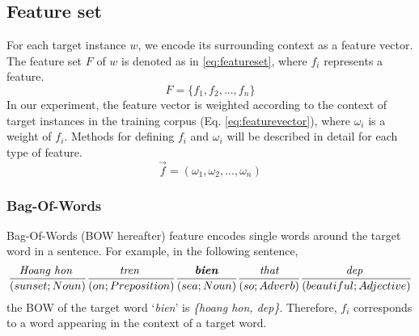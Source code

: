 \documentclass[english]{jnlp_1.4}
\begin{document}
\subsection{Feature set}
\label{featureset}
For each target instance $w$, we encode its surrounding context as a feature vector. 
The feature set $F$ of $w$ is denoted as in \eqref{eq:featureset}, where $ f_{i} $ represents a feature.
\begin{equation}\label{eq:featureset}
 F = \{f_{1},f_{2},...,f_{n}\}
\end{equation} 
 In our experiment, the feature vector is weighted according to the context of target instances in the training corpus (Eq. \eqref{eq:featurevector}), where $ \omega_{i} $ is a weight of $f_{i}$. Methods for defining $f_{i}$ and $\omega_{i}$ will be described in detail for each type of feature.
 \begin{equation}\label{eq:featurevector}
 
 \vec{f} = (\omega_{1},\omega_{2},...,\omega_{n})
 \end{equation}
 
\subsubsection{Bag-Of-Words}
Bag-Of-Words (BOW hereafter) feature encodes single words around the target word in a sentence. 
For example, in the following sentence, 
\[\frac{\textit{Hoang hon }}{(sunset;Noun)} \frac{\textit{tren }}{(on;Preposition)} \frac{\textbf{\textit{bien}} }{(sea;Noun)} \frac{\textit{that} }{(so;Adverb)} \frac{\textit{dep }}{(beautiful;Adjective)} \]
the BOW of the target word `\textit{bien}' is \textit{\{hoang hon, dep\}}. 
Therefore, $f_{i}$ corresponds to a word appearing in the context of a target word.
\end{document}
